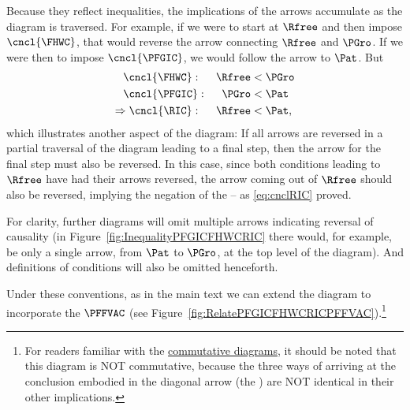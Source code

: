 \documentclass[\econtexRoot/BufferStockTheory]{subfiles}
\begin{document}
Because they reflect inequalities, the implications of the arrows accumulate as the diagram is traversed.  For example, if we were to start at $\Rfree$ and then impose $\cncl{\FHWC}$, that would reverse the arrow connecting $\Rfree$ and $\PGro$.  If we were then to impose $\cncl{\PFGIC}$, we would follow the arrow to {$\Pat$}.  But
\begin{equation}\begin{gathered}\begin{aligned}
  \cncl{\FHWC}:~~~~  \Rfree & < \PGro \notag  
  \\ \cncl{\PFGIC}:~~~~ \PGro & < \Pat %
                                \label{eq:cnclRIC}
  \\ \Rightarrow \cncl{\RIC}:~~~~\Rfree & < \Pat \notag,
\end{aligned}\end{gathered}\end{equation}
which illustrates another aspect of the diagram: If all arrows are reversed in a partial traversal of the diagram leading to a final step, then the arrow for the final step must also be reversed.  In this case, since both conditions leading to $\Rfree$ have had their arrows reversed, the arrow coming out of $\Rfree$ should also be reversed, implying the negation of the {\RIC} -- as \eqref{eq:cnclRIC} proved.

For clarity, further diagrams will omit multiple arrows indicating reversal of causality (in Figure~\ref{fig:InequalityPFGICFHWCRIC} there would, for example, be only a single arrow, from {$\Pat$} to $\PGro$, at the top level of the diagram).  And definitions of conditions will also be omitted henceforth.

Under these conventions, as in the main text we can extend the diagram to incorporate the $\PFFVAC$ (see Figure~\ref{fig:RelatePFGICFHWCRICPFFVAC}).\footnote{For readers familiar with the \href{https://en.wikipedia.org/wiki/Commutative_diagram}{commutative diagrams}, it should be noted that this diagram is NOT commutative, because the three ways of arriving at the conclusion embodied in the diagonal arrow (the {\PFFVAC}) are NOT identical in their other implications.}

\renewcommand{\figName}{RelatePFGICFHWCRICPFFVAC}
\providecommand{\figFile}{\figName}
\hypertarget{\figFile}{}
\hypertarget{\figName}{}

\end{document}
